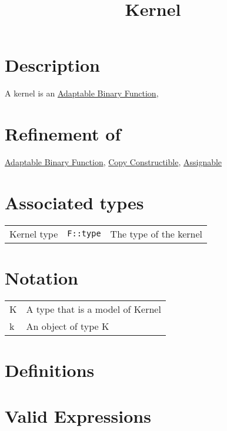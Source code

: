 \documentclass{article}
\begin{document}
\title{Kernel}
\maketitle

\section*{Description}

A kernel is an 
\href{http://www.sgi.com/tech/stl/AdaptableBinaryFunction.html}{Adaptable Binary Function}, 







\section*{Refinement of}

\href{http://www.sgi.com/tech/stl/AdaptableBinaryFunction.html}{Adaptable Binary Function}, 
\href{http://www.boost.org/doc/html/CopyConstructible.html}{Copy Constructible},
\href{http://www.sgi.com/tech/stl/Assignable.html}{Assignable}

\section*{Associated types}

\begin{tabular}{lll}
Kernel type & \texttt{F::type} & The type of the kernel \\
\end{tabular}

\section*{Notation}
\begin{tabular}{ll}
K & A type that is a model of Kernel \\
k & An object of type K \\
\end{tabular}

\section*{Definitions}
\section*{Valid Expressions}
\end{document}
